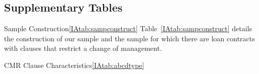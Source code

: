 \documentclass[12pt]{article}
\begin{document}
\begin{appendices}
%
%
\clearpage
\section{Supplementary Tables}
 \label{IApp:extra_tables}

\begin{singlespace}
\renewcommand{\tablesize}{\footnotesize}
\gdef\thetable{IA.\Roman{table}}



\begin{papertable}{Sample Construction}{\ref{IAtab:sampconstruct}}{\vspace{8pt}}
	\label{IAtab:sampconstruct}
    Table~\ref{IAtab:sampconstruct} details the construction of our sample and the sample for which there are loan contracts with clauses that restrict a change of management.

    \startdata
    
\end{papertable}





\begin{landscapepapertable}{CMR Clause Characteristics}{\ref{IAtab:abcdtype}}{}
  \label{IAtab:abcdtype}


\end{landscapepapertable}
\end{singlespace}
\end{appendices}
\end{document}
